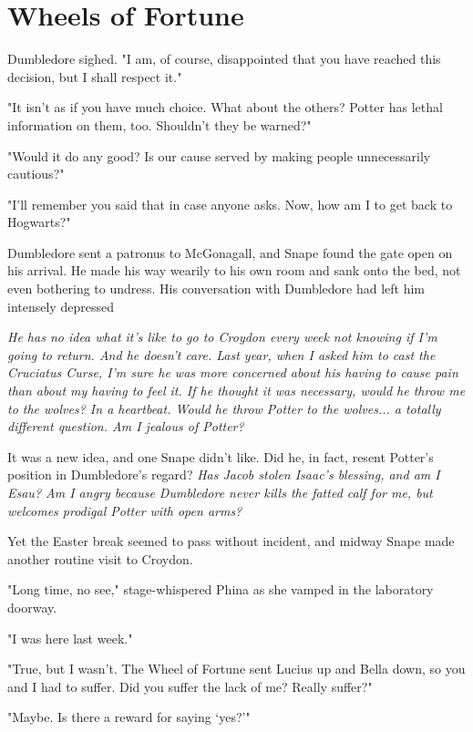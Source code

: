 
\chapter{Wheels of Fortune}

Dumbledore sighed. "I am, of course, disappointed that you have reached this decision, but I shall respect it."

"It isn't as if you have much choice. What about the others? Potter has lethal information on them, too. Shouldn't they be warned?"

"Would it do any good? Is our cause served by making people unnecessarily cautious?"

"I'll remember you said that in case anyone asks. Now, how am I to get back to Hogwarts?"

Dumbledore sent a patronus to McGonagall, and Snape found the gate open on his arrival. He made his way wearily to his own room and sank onto the bed, not even bothering to undress. His conversation with Dumbledore had left him intensely depressed

\emph{He has no idea what it's like to go to Croydon every week not knowing if I'm going to return. And he doesn't care. Last year, when I asked him to cast the Cruciatus Curse, I'm sure he was more concerned about his having to cause pain than about my having to feel it. If he thought it was necessary, would he throw me to the wolves? In a heartbeat. Would he throw Potter to the wolves... a totally different question. Am I jealous of Potter?}

It was a new idea, and one Snape didn't like. Did he, in fact, resent Potter's position in Dumbledore's regard? \emph{Has Jacob stolen Isaac's blessing, and am I Esau? Am I angry because Dumbledore never kills the fatted calf for me, but welcomes prodigal Potter with open arms?}

Yet the Easter break seemed to pass without incident, and midway Snape made another routine visit to Croydon.

"Long time, no see," stage-whispered Phina as she vamped in the laboratory doorway.

"I was here last week."

"True, but I wasn't. The Wheel of Fortune sent Lucius up and Bella down, so you and I had to suffer. Did you suffer the lack of me? Really suffer?"

"Maybe. Is there a reward for saying `yes?'"

